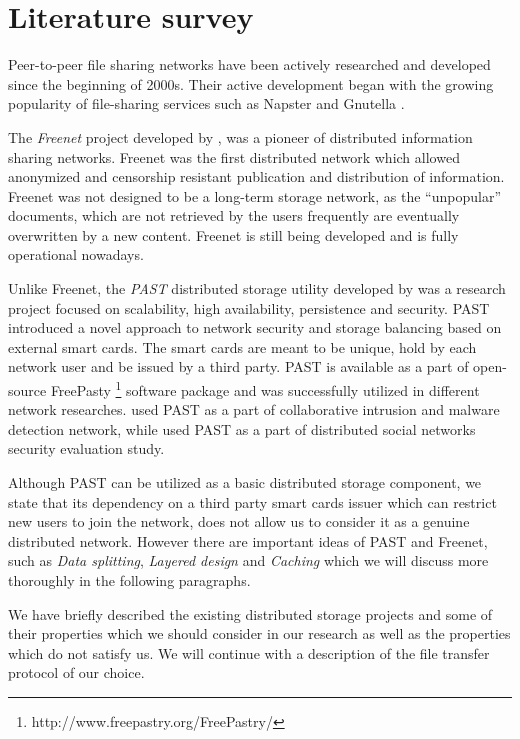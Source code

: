 \section{Literature survey}

Peer-to-peer file sharing networks have been actively researched and
developed since the beginning of 2000s. Their active development began
with the growing popularity of file-sharing services such as Napster
\citep{napster} and Gnutella \citep{gnutella}.

The \emph{Freenet} project developed by \citet{freenet}, was
a pioneer of distributed information sharing networks.
Freenet was the first distributed network which allowed anonymized
and censorship resistant publication and distribution of information.
Freenet was not designed to be a long-term storage network, as
the ``unpopular'' documents, which are not retrieved by the
users frequently are eventually overwritten by a new content.
Freenet is still being developed and is fully operational nowadays.

Unlike Freenet, the \emph{PAST} distributed storage utility
developed by \citet{past} was a research project focused
on scalability, high availability, persistence
and security. PAST introduced a novel approach to \pp network
security and storage balancing based on external smart cards.
The smart cards are meant to be unique, hold by each network
user and be issued by a third party.
PAST is available as a part of open-source FreePasty
\footnote{http://www.freepastry.org/FreePastry/} software package
and was successfully utilized in different \pp network researches.
\citet{p2p-intrusion} used PAST as a part of \pp collaborative
intrusion and malware detection network, while
\citet{p2p-social-security} used PAST as a part of distributed
social networks security evaluation study.

Although PAST can be utilized as a basic distributed storage
component, we state that its dependency on a third party smart
cards issuer which can restrict new users to join the network,
does not allow us to consider it as a genuine distributed network.
However there are important ideas of PAST and Freenet, such as
\emph{Data splitting}, \emph{Layered design} and \emph{Caching}
which we will discuss more thoroughly in the following paragraphs.

We have briefly described the existing distributed storage projects
and some of their properties which we should consider in our research
as well as the properties which do not satisfy us. We will continue
with a description of the file transfer protocol of our choice.

